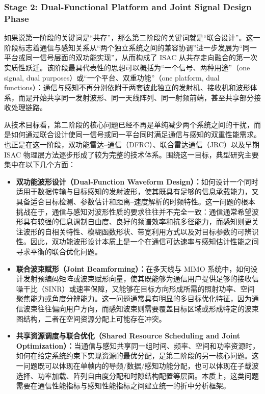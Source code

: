 \subsubsection{Stage 2: Dual-Functional Platform and Joint Signal Design Phase}
\label{subsubsec:ch1-stage2}

如果说第一阶段的关键词是“共存”，那么第二阶段的关键词就是“联合设计”。这一阶段标志着通信与感知关系从“两个独立系统之间的兼容协调”进一步发展为“同一平台或同一信号层面的双功能实现”，从而构成了 ISAC 从共存走向融合的第一次实质性跃迁。该阶段最具代表性的思想可以概括为“一个信号、两种用途”（one signal, dual purposes）或“一个平台、双重功能”（one platform, dual functions）：通信与感知不再分别依附于两套彼此独立的发射机、接收机和波形体系，而是开始共享同一发射波形、同一天线阵列、同一射频前端，甚至共享部分接收处理链路。

从技术目标看，第二阶段的核心问题已经不再是单纯减少两个系统之间的干扰，而是如何通过联合设计使同一信号或同一平台同时满足通信与感知的双重性能需求。也正是在这一阶段，双功能雷达--通信（DFRC）、联合雷达通信（JRC）以及早期 ISAC 物理层方法逐步形成了较为完整的技术体系\cite{Liu2020JointRadarComm,Zhang2021ISAC6G,Hassanien2015dual}。围绕这一目标，典型研究主要集中在以下几个方面：
\begin{itemize}
    \item \textbf{双功能波形设计（Dual-Function Waveform Design）：}如何设计一个同时适用于数据传输与目标感知的发射波形，使其既具有足够的信息承载能力，又具备适合目标检测、参数估计和距离--速度解析的时频特性\cite{Liu2020JointRadarComm,Hassanien2015dual}。这一问题的根本挑战在于，通信与感知对波形性质的要求往往并不完全一致：通信通常希望波形具有较强的信息调制自由度、良好的频谱效率和抗多径能力，而感知则更关注波形的自相关特性、模糊函数形状、带宽利用方式以及对目标参数的可辨识性。因此，双功能波形设计本质上是一个在通信可达速率与感知估计性能之间寻求平衡的联合优化问题。
    \item \textbf{联合波束赋形（Joint Beamforming）：}在多天线与 MIMO 系统中，如何设计发射预编码矩阵或波束赋形向量，使其既能够为通信用户提供足够的接收信噪干比（SINR）或速率保障，又能够在目标方向形成所需的照射功率、空间聚焦能力或角度分辨能力\cite{Liu2020JointRadarComm,Liu2022ISAC}。这一问题通常具有明显的多目标优化特征，因为通信波束往往偏向用户方向，而感知波束则需要覆盖目标区域或形成特定的波束图结构，二者在空间资源分配上可能存在冲突。
    \item \textbf{共享资源调度与联合优化（Shared Resource Scheduling and Joint Optimization）：}当通信与感知共享同一组时间、频率、空间和功率资源时，如何在给定系统约束下实现资源的最优分配，是第二阶段的另一核心问题\cite{Zhang2021ISAC6G,Liu2022ISAC}。这一问题既可以体现在单帧内的导频/数据/感知功能分配，也可以体现在子载波选择、功率加载、阵列自由度分配和时隙结构配置等层面。本质上，这类问题需要在通信性能指标与感知性能指标之间建立统一的折中分析框架。
\end{itemize}
